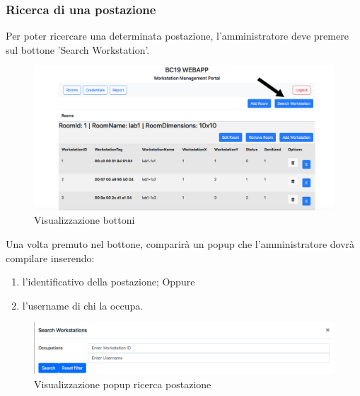 \subsubsection{Ricerca di una postazione}
Per poter ricercare una determinata postazione, l'amministratore deve premere sul bottone 'Search Workstation'.
\begin{figure}[H]
	\centering
	\includegraphics[width=15cm]{res/images/bottoneSearchWorkstation.png}
	\caption{Visualizzazione bottoni}
\end{figure}
Una volta premuto nel bottone, comparirà un popup che l'amministratore dovrà compilare inserendo:
\begin{enumerate}
\item l'identificativo della postazione;
Oppure
\item l'username di chi la occupa.
\end{enumerate}
\begin{figure}[H]
	\centering
	\includegraphics[width=15cm]{res/images/ricercaPostazione.png}
	\caption{Visualizzazione popup ricerca postazione}
\end{figure}

